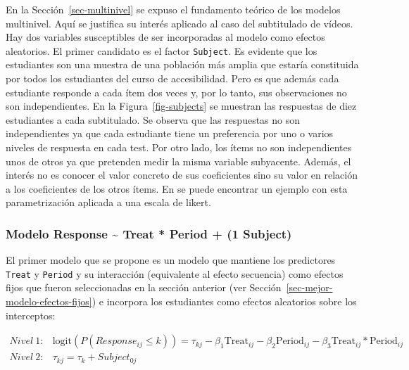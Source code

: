 \documentclass[
  12pt,
  a4paper,
  extrafontsizes,
  onecolumn,
  openright,
  table]{memoir}
\begin{document}
En la Sección~\ref{sec-multinivel} se expuso el fundamento teórico de
los modelos multinivel. Aquí se justifica su interés aplicado al caso
del subtitulado de vídeos. Hay dos variables susceptibles de ser
incorporadas al modelo como efectos aleatorios. El primer candidato es
el factor \texttt{Subject}. Es evidente que los estudiantes son una
muestra de una población más amplia que estaría constituida por todos
los estudiantes del curso de \gls{accesibilidad}. Pero es que además
cada estudiante responde a cada ítem dos veces y, por lo tanto, sus
observaciones no son independientes. En la Figura~\ref{fig-subjects} se
muestran las respuestas de diez estudiantes a cada subtitulado. Se
observa que las respuestas no son independientes ya que cada estudiante
tiene un preferencia por uno o varios niveles de respuesta en cada test.
Por otro lado, los ítems no son independientes unos de otros ya que
pretenden medir la misma variable subyacente. Además, el interés no es
conocer el valor concreto de sus coeficientes sino su valor en relación
a los coeficientes de los otros ítems. En
\textcite[pp.~14-16]{burkner2021} \textcite[pp.~19-20]{burkner2019} se
puede encontrar un ejemplo con esta parametrización aplicada a una
\gls{escala de likert}.

\hypertarget{modelo-response-treat-period-1-subject}{%
\subsubsection{Modelo Response \textasciitilde{} Treat * Period + (1
\textbar{} Subject)}\label{modelo-response-treat-period-1-subject}}

El primer modelo que se propone es un modelo que mantiene los
predictores \texttt{Treat} y \texttt{Period} y su interacción
(equivalente al \gls{efecto secuencia}) como efectos fijos que fueron
seleccionadas en la sección anterior (ver
Sección~\ref{sec-mejor-modelo-efectos-fijos}) e incorpora los
estudiantes como efectos aleatorios sobre los interceptos:

\small

\[
\begin{aligned}
Nivel\ 1: & \text{logit}(P(Response_{ij} \leq k)) = \tau_{kj} - \beta_1 \text{Treat}_{ij} - \beta_2 \text{Period}_{ij} - \beta_3 \text{Treat}_{ij} * \text{Period}_{ij} \\
Nivel\ 2: & \tau_{kj}  =  \tau_{k} + Subject_{0j}
\end{aligned}
\]

\normalsize
\end{document}
